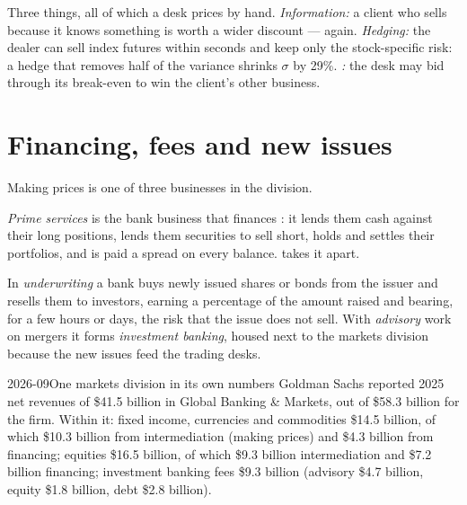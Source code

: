 \begin{remark}\label{rem:m1:the-sell-side:limits}
Three things, all of which a desk prices by hand. \emph{Information:} a
client who sells because it knows something is worth a wider discount ---
 again. \emph{Hedging:} the dealer can sell index futures
within seconds and keep only the stock-specific risk: a hedge that removes
half of the variance shrinks $\sigma$ by 29\%. \emph{:} the desk may
bid through its break-even to win the client's other business.
\end{remark}

\section{Financing, fees and new issues}

Making prices is one of three businesses in the division.

\begin{definition}\label{def:m1:the-sell-side:prime}
\emph{Prime services} is the bank business that
finances : it lends them cash against their long positions,
lends them securities to sell short, holds and settles their portfolios, and
is paid a spread on every balance.  takes it apart.
\end{definition}

\begin{definition}[Underwriting]\label{def:m1:the-sell-side:underwriting}
In \emph{underwriting} a bank buys newly issued shares or
bonds from the issuer and resells them to investors, earning a percentage of
the amount raised and bearing, for a few hours or days, the risk that the
issue does not sell. With \emph{advisory} work on mergers it forms
\emph{investment banking}, housed next to the markets division because the
new issues feed the trading desks.
\end{definition}

\begin{dated}{2026-09}{One markets division in its own numbers}\label{dat:m1:the-sell-side:gs}
Goldman Sachs reported 2025 net revenues of \$41.5 billion in Global Banking
\& Markets, out of \$58.3 billion for the firm. Within it: fixed income,
currencies and commodities \$14.5 billion, of which \$10.3 billion from
intermediation (making prices) and \$4.3 billion from financing; equities
\$16.5 billion, of which \$9.3 billion intermediation and \$7.2 billion
financing; investment banking fees \$9.3 billion (advisory \$4.7 billion,
equity  \$1.8 billion, debt  \$2.8 billion).
\end{dated}

